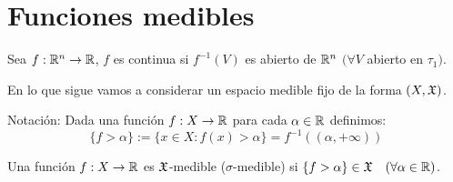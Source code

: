 \section{Funciones medibles}

\begin{prop}
    Sea $f: \mathbb{R}^n \to \mathbb{R}$, $f$ es continua si $f^{-1}(V)$ es abierto de $ \mathbb{R}^n$ $(\forall V$ abierto en $\tau_1)$.
\end{prop}
En lo que sigue vamos a considerar un espacio medible fijo de la forma $(X, \mathfrak{X})$.

Notación: Dada una función $f: X \to \mathbb{R}$ para cada $\alpha \in \mathbb{R}$ definimos: \begin{equation*}
    \{ f > \alpha \} := \{ x \in X : f(x) > \alpha \} = f^{-1}((\alpha, +\infty))
\end{equation*}

\begin{definition}
    Una función $f: X \to \mathbb{R}$ es $\mathfrak{X}$-medible ($ \sigma $-medible) si $\{ f > \alpha \} \in \mathfrak{X} \quad (\forall \alpha \in \mathbb{R})$.
\end{definition}

\clearpage

